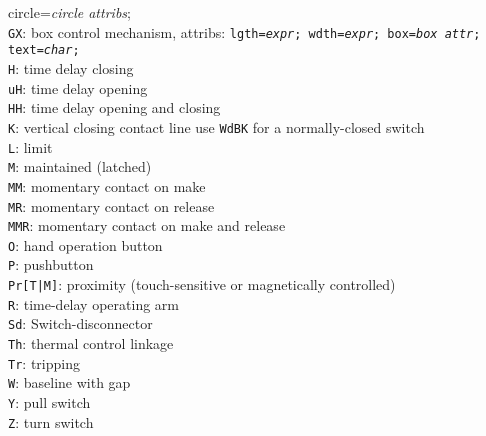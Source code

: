 {{                                         circle={\sl circle attribs};}\\
                                   {\tt GX}: box control mechanism, attribs:
                                    {\tt lgth={\sl expr}; wdth={\sl expr};
                                         box={\sl box attr};}
                                    {\tt text={\sl char};}\\
                                   {\tt H}: time delay closing\\
                                   {\tt uH}: time delay opening\\
                                   {\tt HH}: time delay opening and closing\\
                                   {\tt K}: vertical closing contact line
                                     use {\tt WdBK} for a normally-closed
                                     switch\\
                                   {\tt L}: limit\\
                                   {\tt M}: maintained (latched)\\
                                   {\tt MM}: momentary contact on make\\
                                   {\tt MR}: momentary contact on release\\
                                   {\tt MMR}: momentary contact on make and
                                     release\\
                                   {\tt O}: hand operation button\\
                                   {\tt P}: pushbutton\\
                                   {\tt Pr[T|M]}: proximity (touch-sensitive or
                                       magnetically controlled)\\
                                   {\tt R}: time-delay operating arm\\
                                   {\tt Sd}: Switch-disconnector\\
                                   {\tt Th}: thermal control linkage\\
                                   {\tt Tr}: tripping\\
                                   {\tt W}: baseline with gap\\
                                   {\tt Y}: pull switch\\
                                   {\tt Z}: turn switch
   }%
